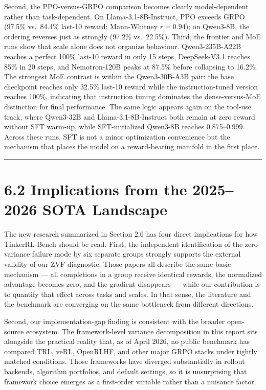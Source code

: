 \documentclass[
  american,
  11pt,
  a4paper,
  oneside]{report}
\begin{document}
Second, the PPO-versus-GRPO comparison becomes clearly model-dependent
rather than task-dependent. On Llama-3.1-8B-Instruct, PPO exceeds GRPO
(97.5\% vs.~84.4\% last-10 reward; Mann-Whitney \(r=0.94\)); on
Qwen3-8B, the ordering reverses just as strongly (97.2\% vs.~22.5\%).
Third, the frontier and MoE runs show that scale alone does not organize
behaviour. Qwen3-235B-A22B reaches a perfect 100\% last-10 reward in
only 15 steps, DeepSeek-V3.1 reaches 85\% in 20 steps, and Nemotron-120B
peaks at 87.5\% before collapsing to 16.2\%. The strongest MoE contrast
is within the Qwen3-30B-A3B pair: the base checkpoint reaches only
32.5\% last-10 reward while the instruction-tuned version reaches 100\%,
indicating that instruction tuning dominates the dense-versus-MoE
distinction for final performance. The same logic appears again on the
tool-use track, where Qwen3-32B and Llama-3.1-8B-Instruct both remain at
zero reward without SFT warm-up, while SFT-initialized Qwen3-8B reaches
0.875--0.999. Across these runs, SFT is not a minor optimization
convenience but the mechanism that places the model on a reward-bearing
manifold in the first place.

\begin{center}\rule{0.5\linewidth}{0.5pt}\end{center}

\section{6.2 Implications from the 2025--2026 SOTA
Landscape}\label{implications-from-the-20252026-sota-landscape}

The new research summarized in Section 2.6 has four direct implications
for how TinkerRL-Bench should be read. First, the independent
identification of the zero-variance failure mode by six separate groups
strongly supports the external validity of our ZVF diagnostic. Those
papers all describe the same basic mechanism --- all completions in a
group receive identical rewards, the normalized advantage becomes zero,
and the gradient disappears --- while our contribution is to quantify
that effect across tasks and scales. In that sense, the literature and
the benchmark are converging on the same bottleneck from different
directions.

Second, our implementation-gap finding is consistent with the broader
open-source ecosystem. The framework-level variance decomposition in
this report sits alongside the practical reality that, as of April 2026,
no public benchmark has compared TRL, veRL, OpenRLHF, and other major
GRPO stacks under tightly matched conditions. Those frameworks have
diverged substantially in rollout backends, algorithm portfolios, and
default settings, so it is unsurprising that framework choice emerges as
a first-order variable rather than a nuisance factor.
\end{document}
